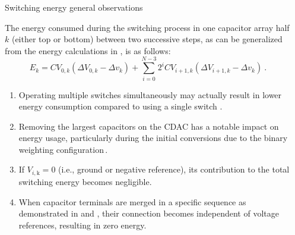 \documentclass[final]{beamer}
\newlength{\sepwidth}
\newlength{\colwidth}
\newcommand{\separatorcolumn}{\begin{column}{\sepwidth}\end{column}}
\begin{document}
\begin{frame}[t]
\begin{columns}[t]
\separatorcolumn

\begin{column}{\colwidth}

\begin{block}{Switching energy general observations}

    The energy consumed during the switching process in one capacitor array half $k$ (either top or bottom) between two successive steps, as can be generalized from the energy calculations in \cite{Ginsburg}, is as follows:
    \begin{equation} \label{eq:e}
        E_{k} = C V_{0,k} \left( \Delta V_{0,k} - \Delta v_{k} \right) + \sum_{i=0}^{N-3} 2^i C V_{i+1,k} \left( \Delta V_{i+1,k} - \Delta v_{k} \right) \ .
    \end{equation}
    
    
    \begin{enumerate}
      \item Operating multiple switches simultaneously may actually result in lower energy consumption compared to using a single switch \cite{Xin21}.
      \item Removing the largest capacitors on the  CDAC has a notable impact on energy usage, particularly during the initial conversions due to the binary weighting configuration\,\cite{Yuan12, Sanyal13, Zhu13}. 
      \item If $V_{i,\text{k}} = 0$ (i.e., ground or negative reference), its contribution to the total switching energy becomes negligible. 
      \item When capacitor terminals are merged in a specific sequence as demonstrated in \cite{Xin21} and \cite{Wu17}, their connection becomes independent of voltage references, resulting in zero energy.
    \end{enumerate}

\end{block}



\end{column}
\end{columns}
\end{frame}
\end{document}
